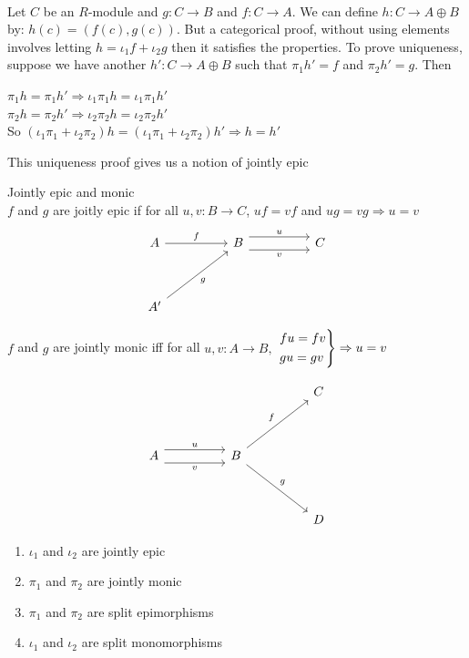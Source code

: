 \documentclass{report}
\begin{document}
\begin{prf}{}{}\\
Let $C $ be an $R$-module and $g: C \to B$ and $f: C \to A$. We can define $h: C \to A\oplus B$ by: $h(c) = (f(c), g(c))$. But a categorical proof, without using elements involves letting $ h = \iota _1 f + \iota _2g$ then it satisfies the properties. To prove uniqueness, suppose we have another $h': C \to A \oplus B$ such that $\pi _1h'=f$ and $\pi _2h' = g$. Then
\begin{center}
    $\pi _1h=\pi _1h' \Rightarrow \iota _1\pi _1h=\iota _1\pi_1h'$ \\ 
    $\pi _2h=\pi _2h' \Rightarrow \iota _2\pi _2h=\iota _2\pi_2h'$ \\ 
    So $(\iota _1\pi _1 +\iota _2 \pi _2 )h = (\iota _1\pi _1+\iota _2\pi _2)h' \Rightarrow h=h'$
\end{center}

\end{prf}

This uniqueness proof gives us a notion of jointly epic

\begin{definition}{Jointly epic and monic}{}\\
$f$ and $g$ are joitly epic if for all $u,v:B \to C$, $uf=vf$ and $ug=vg \Rightarrow u=v$
\[
\begin{tikzcd}[column sep=huge, row sep=huge]
A \arrow[r, "f"] & B \arrow[r, shift left=1.2ex, "u"] \arrow[r, shift right=1.2ex, "v"'] & C \\
A' \arrow[ur, "g"'] &
\end{tikzcd}
\]

$f$ and $g$ are jointly monic iff for all $u,v:A \to B,$ 
$
\begin{rcases*}
fu = fv  \\ gu = gv
\end{rcases*} \Rightarrow u=v
$

\[
\begin{tikzcd}[column sep=huge, row sep=huge]
& & C \\ A \arrow[r, shift left=1.2ex, "u"] \arrow[r, shift right=1.2ex, "v"'] & B \arrow[ur, "f"] \arrow[dr, "g"] & \\ & & D
\end{tikzcd}
\]
    
\end{definition}

\begin{lemma}{}{} 
\begin{enumerate}
    \item $\iota_1 $ and $\iota _2$ are jointly epic
    \item $\pi _1$ and $\pi _2$ are jointly monic
    \item $\pi _1 $ and $\pi _2$ are split epimorphisms
    \item $\iota _1$ and $\iota _2$ are split monomorphisms
\end{enumerate}
\end{lemma}
\end{document}
